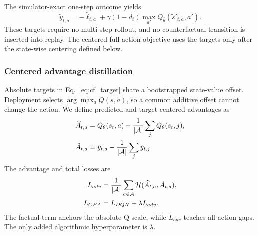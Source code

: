 \documentclass[remotesensing,article,submit,moreauthors]{Definitions/mdpi}
\begin{document}
The simulator-exact one-step outcome yields
\begin{equation}
\tilde y_{t,a}=-\tilde \ell_{t,a}+\gamma(1-d_t)
\max_{a'}Q_{\bar\theta}(\tilde s'_{t,a},a').
\label{eq:cf_target}
\end{equation}
These targets require no multi-step rollout, and no counterfactual transition is inserted into replay. The centered full-action objective uses the targets only after the state-wise centering defined below.

\subsubsection{Centered advantage distillation}

Absolute targets in Eq.~\eqref{eq:cf_target} share a bootstrapped state-value offset. Deployment selects $\arg\max_a Q(s,a)$, so a common additive offset cannot change the action. We define predicted and target centered advantages as
\begin{align}
\widehat A_{t,a}&=Q_\theta(s_t,a)-\frac{1}{|\mathcal A|}\sum_jQ_\theta(s_t,j),\notag\\
\tilde A_{t,a}&=\tilde y_{t,a}-\frac{1}{|\mathcal A|}\sum_j\tilde y_{t,j}.
\label{eq:center}
\end{align}
The advantage and total losses are
\begin{align}
L_{adv}&=\frac{1}{|\mathcal A|}
\sum_{a\in\mathcal A}\mathcal H(\widehat A_{t,a},\tilde A_{t,a}),\notag\\
L_{CFA}&=L_{DQN}+\lambda L_{adv}.
\label{eq:cbad}
\end{align}
The factual term anchors the absolute Q scale, while $L_{adv}$ teaches all action gaps. The only added algorithmic hyperparameter is $\lambda$.
\end{document}
